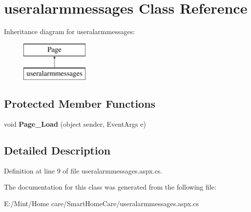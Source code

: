 \hypertarget{classuseralarmmessages}{\section{useralarmmessages Class Reference}
\label{classuseralarmmessages}
}
Inheritance diagram for useralarmmessages\-:\begin{figure}[H]
\begin{center}
\leavevmode
\includegraphics[height=2.000000cm]{classuseralarmmessages}
\end{center}
\end{figure}
\subsection*{Protected Member Functions}
\begin{DoxyCompactItemize}
\item 
\hypertarget{classuseralarmmessages_abced9091eec5a5bf2f615fb82c8ee6f6}{void {\bfseries Page\-\_\-\-Load} (object sender, Event\-Args e)}\label{classuseralarmmessages_abced9091eec5a5bf2f615fb82c8ee6f6}

\end{DoxyCompactItemize}


\subsection{Detailed Description}


Definition at line 9 of file useralarmmessages.\-aspx.\-cs.



The documentation for this class was generated from the following file\-:\begin{DoxyCompactItemize}
\item 
E\-:/\-Mint/\-Home care/\-Smart\-Home\-Care/useralarmmessages.\-aspx.\-cs\end{DoxyCompactItemize}
